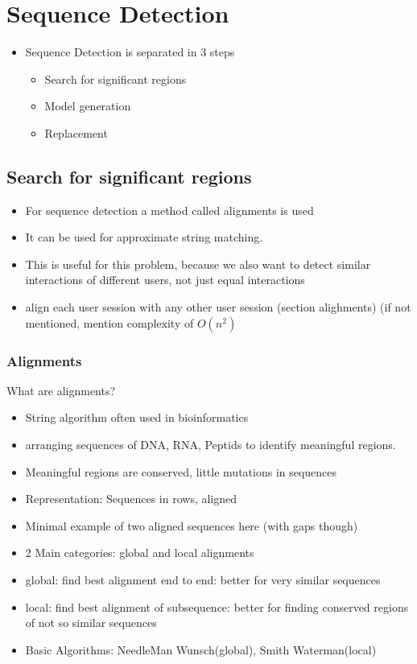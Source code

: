 \section{Sequence Detection}
\begin{itemize}
	\item Sequence Detection is separated in 3 steps
	\begin{itemize}
		\item Search for significant regions
		\item Model generation
		\item Replacement
	\end{itemize}
\end{itemize}
\subsection{Search for significant regions}		
\begin{itemize}
	\item For sequence detection a method called alignments is used
	\item It can be used for approximate string matching. 
	\item This is useful for this problem, because we also want to detect similar interactions of different users, not just equal interactions
	\item align each user session with any other user session (section alighments)  (if not mentioned, mention complexity of $O(n^2)$
\end{itemize}
\subsubsection{Alignments}
What are alignments? 
\begin{itemize}
	\item String algorithm often used in bioinformatics 
	\item arranging sequences of DNA, RNA, Peptids to identify meaningful regions.
	\item Meaningful regions are conserved, little mutations in sequences
	\item Representation: Sequences in rows, aligned 
	\item Minimal example of two aligned sequences here (with gaps though)
	\item 2 Main categories: global and local alignments 
	\item global: find best alignment end to end: better for very similar sequences
	\item local: find best alignment of subsequence: better for finding conserved regions of not so similar sequences
	\item Basic Algorithms: NeedleMan Wunsch(global), Smith Waterman(local) 
\end{itemize} 

